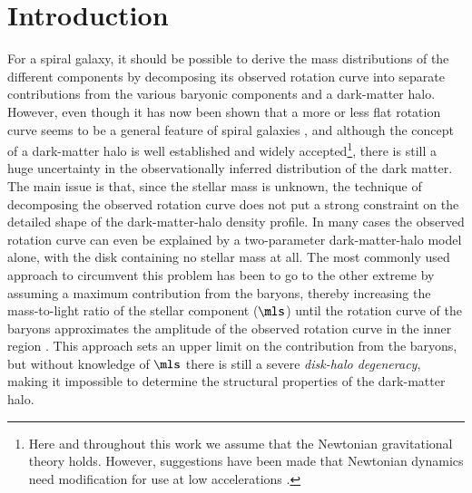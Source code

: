 \documentclass[traditabstract]{aa} %
\begin{document}

 \maketitle



\section{Introduction}
\label{sec:Introduction}
For a spiral galaxy, it should be possible to derive the mass distributions of the
different components by decomposing its observed rotation curve into separate
contributions from the various baryonic components and a dark-matter halo.
However, even though it has now been shown that a more or less flat rotation curve seems
to be a general feature of spiral galaxies \citep [e.g.,][]{bosma1978, bosma1981a,
bosma1981b, begeman1987, begeman1989, sofue1999, sofue2001}, and although the concept of a
dark-matter halo is well established and widely accepted\footnote{Here and
throughout this work we assume that the Newtonian gravitational theory holds. However,
suggestions have been made that Newtonian dynamics need modification for use at low
accelerations \citep[e.g.,][]{milgrom1983, begeman1991, sanders1996, sanders1998}.},
there is still a huge uncertainty in the observationally inferred distribution of the
dark matter. The main issue is that, since the stellar mass is unknown, the technique of
decomposing the observed rotation curve does not put a strong constraint on the detailed
shape of the dark-matter-halo density profile. In many cases the observed rotation curve
can even be explained by a two-parameter dark-matter-halo model alone, with the disk 
containing no stellar mass at all. The most commonly used approach to circumvent this
problem has been to go to the other extreme by assuming a maximum contribution from the
baryons, thereby increasing the mass-to-light ratio of the stellar component ($\mls$)
until the rotation curve of the baryons approximates the amplitude of the observed
rotation curve in the inner region 
\citep[the ``maximum-disk hypothesis'';][]{AlbadaSancisi1986}.
This approach sets an upper limit on the contribution from the baryons, but without
knowledge of $\mls$ there is still a severe \textit{disk-halo degeneracy}, making it
impossible to determine the structural properties of the dark-matter halo.
\end{document}
